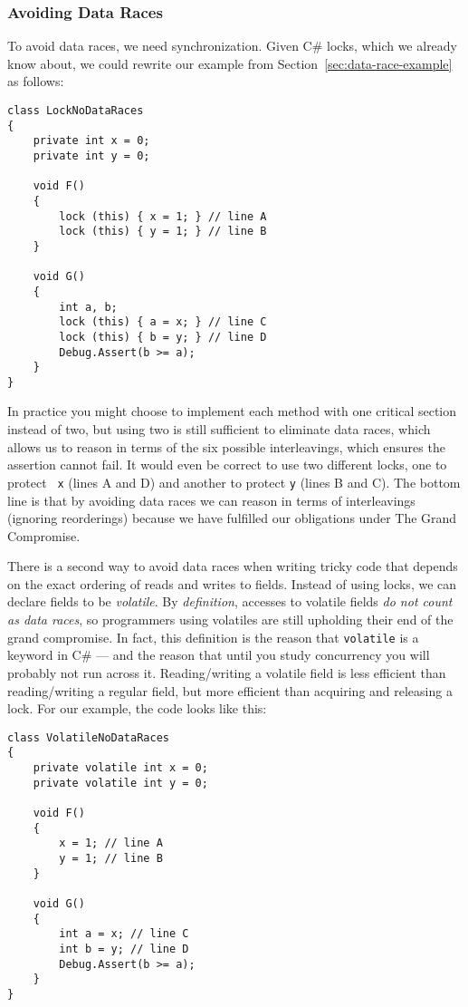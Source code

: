 \documentclass[10pt]{article}
\begin{document}
\subsubsection{Avoiding Data Races}

To avoid data races, we need synchronization.  Given C\# locks,
which we already know about, we could rewrite our example from
Section~\ref{sec:data-race-example} as follows:
\begin{verbatim}
class LockNoDataRaces
{
    private int x = 0;
    private int y = 0;

    void F()
    {
        lock (this) { x = 1; } // line A
        lock (this) { y = 1; } // line B
    }

    void G()
    {
        int a, b;
        lock (this) { a = x; } // line C
        lock (this) { b = y; } // line D
        Debug.Assert(b >= a);
    }
}
\end{verbatim}
In practice you might choose to implement each method with one
critical section instead of two, but using two is still sufficient to
eliminate data races, which allows us to reason in terms of the six
possible interleavings, which ensures the assertion cannot fail.  It
would even be correct to use two different locks, one to protect {\tt
  x} (lines A and D) and another to protect {\tt y} (lines B and C).
The bottom line is that by avoiding data races we can reason in terms
of interleavings (ignoring reorderings) because we have fulfilled our
obligations under The Grand Compromise.

There is a second way to avoid data races when writing tricky code
that depends on the exact ordering of reads and writes to fields.
Instead of using locks, we can declare fields to be \emph{volatile}.
By \emph{definition}, accesses to volatile fields \emph{do not count
  as data races}, so programmers using volatiles are still upholding
their end of the grand compromise.  In fact, this definition is the
reason that {\tt volatile} is a keyword in C\# --- and the reason
that until you study concurrency you will probably not run across it.
Reading/writing a volatile field is less efficient than
reading/writing a regular field, but more efficient than acquiring and
releasing a lock.  For our example, the code looks like this:
\begin{verbatim}
class VolatileNoDataRaces
{
    private volatile int x = 0;
    private volatile int y = 0;

    void F()
    {
        x = 1; // line A
        y = 1; // line B
    }

    void G()
    {
        int a = x; // line C
        int b = y; // line D
        Debug.Assert(b >= a);
    }
}
\end{verbatim}
\end{document}
